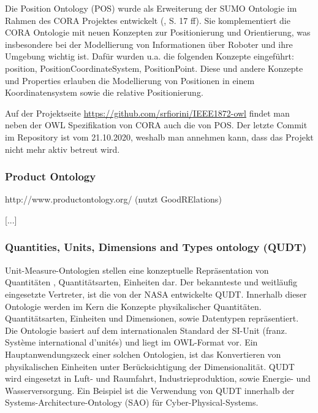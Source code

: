 \documentclass{article}
\begin{document}

Die Position Ontology (POS) wurde als Erweiterung der SUMO Ontologie im Rahmen des CORA Projektes entwickelt (\cite{fiorini2015extensions}, S. 17 ff).
Sie komplementiert die CORA Ontologie mit neuen Konzepten zur Positionierung und Orientierung, was insbesondere bei der Modellierung von Informationen über Roboter und ihre Umgebung wichtig ist.
Dafür wurden u.a. die folgenden Konzepte eingeführt: position, PositionCoordinateSystem, PositionPoint.
Diese und andere Konzepte und Properties erlauben die Modellierung von Positionen in einem Koordinatensystem sowie die relative Positionierung.

Auf der Projektseite \url{https://github.com/srfiorini/IEEE1872-owl} findet man neben der OWL Spezifikation von CORA auch die von POS. Der letzte Commit im Repository ist vom 21.10.2020, weshalb man annehmen kann, dass das Projekt nicht mehr aktiv betreut wird.

\subsubsection{Product Ontology}

http://www.productontology.org/ (nutzt GoodRElations)

[...]

\subsubsection{Quantities, Units, Dimensions and Types ontology (QUDT)}

Unit-Measure-Ontologien stellen eine konzeptuelle Repräsentation von Quantitäten , Quantitätsarten, Einheiten dar. Der bekannteste und weitläufig eingesetzte Vertreter, ist die von der NASA entwickelte QUDT\cite{QUDTOntology}. Innerhalb dieser Ontologie werden im Kern die Konzepte physikalischer Quantitäten. Quantitätsarten, Einheiten und Dimensionen, sowie Datentypen repräsentiert. Die Ontologie basiert auf dem internationalen Standard der SI-Unit (franz. Système international d'unités) und liegt im OWL-Format vor. Ein Hauptanwendungszeck einer solchen Ontologien, ist das Konvertieren von physikalischen  Einheiten unter Berücksichtigung der Dimensionalität.
QUDT wird eingesetzt in Luft- und Raumfahrt, Industrieproduktion, sowie Energie- und Wasserversorgung. Ein Beispiel ist die Verwendung von QUDT innerhalb der Systems-Architecture-Ontology (SAO) für Cyber-Physical-Systems.
\end{document}
